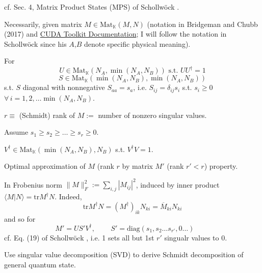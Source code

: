 cf. Sec. 4, Matrix Product States (MPS) of Schollw\"{o}ck \cite{agat:Scho2010}.  

Necessarily, given matrix $M\in \text{Mat}_{\mathbb{K}}(M,N)$ (notation in Bridgeman and Chubb (2017) \cite{agat:BrCh2017} and \href{http://docs.nvidia.com/cuda/cusolver/index.html}{CUDA Toolkit Documentation}; I will follow the notation in Schollw\"{o}ck \cite{agat:Scho2010} since his $A$,$B$ denote specific physical meaning).  

For 
\[
U\in \text{Mat}_{\mathbb{K}}(N_A, \min{(N_A,N_B)}) \text{ s.t. } UU^{\dag}=1
\]
\[
S \in \text{Mat}_{\mathbb{K}}(\min{(N_A,N_B)}, \min{(N_A,N_B)} )
\]
s.t. $S$ diagonal with nonnegative $S_{aa} = s_a$, i.e. $S_{ij} = \delta_{ij}s_i$ s.t. $s_i\geq 0$ \, $\forall \, i = 1,2, \dots \min{(N_A,N_B)}$.  

$r\equiv $ (Schmidt) rank of $M :=$ number of nonzero singular values.  

Assume $s_1\geq s_2 \geq \dots \geq s_r \geq 0$.  

$V^{\dag} \in \text{Mat}_{\mathbb{K}}(\min{(N_A,N_B)},N_B)$ s.t. $V^{\dag}V=1$.  


Optimal approximation of $M$ (rank $r$ by matrix $M'$ (rank $r' <r$) property.  

In Frobenius norm $\| M \|_F^2 := \sum_{i,j} |M_{ij}|^2$, induced by inner product $\langle M | N \rangle =\text{tr}M^{\dag}N$.  Indeed, 
\[
\text{tr}M^{\dag}N = (M^{\dag})_{ik} N_{ki} = \overline{M}_{ki} N_{ki}
\]
and so for 
\begin{equation}
M'=US'V^{\dag}, \qquad \, S'=\text{diag}(s_1,s_2 \dots s_{r'}, 0 \dots ) \qquad \,
\end{equation}
cf. Eq. (19) of Schollw\"{o}ck \cite{agat:Scho2010}, i.e. 1 sets all but 1st $r'$ singualr values to $0$.  

Use singular value decomposition (SVD) to derive Schmidt decomposition of general quantum state. 

